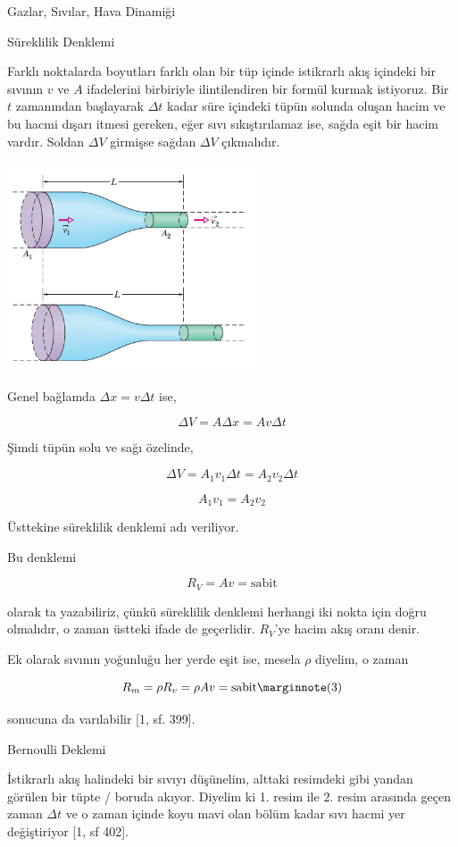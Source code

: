 \documentclass[12pt,fleqn]{article}\usepackage{../../common}
\begin{document}
Gazlar, Sıvılar, Hava Dinamiği

Süreklilik Denklemi

Farklı noktalarda boyutları farklı olan bir tüp içinde istikrarlı akış içindeki
bir sıvının $v$ ve $A$ ifadelerini birbiriyle ilintilendiren bir formül kurmak
istiyoruz. Bir $t$ zamanından başlayarak $\Delta t$ kadar süre içindeki tüpün
solunda oluşan hacim ve bu hacmi dışarı itmesi gereken, eğer sıvı sıkıştırılamaz
ise, sağda eşit bir hacim vardır. Soldan $\Delta V$ girmişse sağdan $\Delta V$
çıkmalıdır.

\includegraphics[width=20em]{phy_045_flight_01.png}

Genel bağlamda $\Delta x = v \Delta t$ ise,

$$
\Delta V = A \Delta x = A v \Delta t
$$

Şimdi tüpün solu ve sağı özelinde,

$$
\Delta V = A_1 v_1 \Delta t = A_2 v_2 \Delta t
$$

$$
A_1 v_1 = A_2 v_2
$$

Üsttekine süreklilik denklemi adı veriliyor.

Bu denklemi 

$$
R_V = A v = \textrm{sabit}
$$

olarak ta yazabiliriz, çünkü süreklilik denklemi herhangi iki nokta için
doğru olmalıdır, o zaman üstteki ifade de geçerlidir. $R_V$'ye hacim akış
oranı denir. 

Ek olarak sıvının yoğunluğu her yerde eşit ise, mesela $\rho$ diyelim, o
zaman 

$$
R_m = \rho R_v = \rho A v = \textrm{sabit}
\mlabel{3}
$$

sonucuna da varılabilir [1, sf. 399].


Bernoulli Deklemi

İstikrarlı akış halindeki bir sıvıyı düşünelim, alttaki resimdeki gibi
yandan görülen bir tüpte / boruda akıyor. Diyelim ki 1. resim ile 2. resim
arasında geçen zaman $\Delta t$ ve o zaman içinde koyu mavi olan bölüm
kadar sıvı hacmi yer değiştiriyor [1, sf 402].
\end{document}
